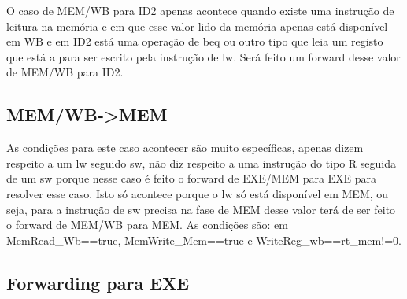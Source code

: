 \documentclass[pdftex,12pt,a4paper]{report}
\begin{document}
O caso de MEM/WB para ID2 apenas acontece quando existe uma instrução de leitura na memória e em que esse valor lido da memória apenas está disponível em WB e em ID2 está uma operação de beq ou outro tipo que leia um registo que está a para ser escrito pela instrução de lw. Será feito um forward desse valor de MEM/WB para ID2.

\subsection{MEM/WB->MEM}
\begin{table}[!htb]
\centering
\label{my-label}
\end{table}

As condições para este caso acontecer são muito específicas, apenas dizem respeito a um lw seguido sw, não diz respeito a uma instrução do tipo R seguida de um sw porque nesse caso é feito o forward de EXE/MEM para EXE para resolver esse caso. Isto só acontece porque o lw só está disponível em MEM, ou seja, para a instrução de sw precisa na fase de MEM desse valor terá de ser feito o forward de MEM/WB para MEM. 
As condições são: em MemRead{\_}Wb==true, MemWrite{\_}Mem==true e WriteReg{\_}wb==rt{\_}mem!=0.

\subsection{Forwarding para EXE}
\end{document}
